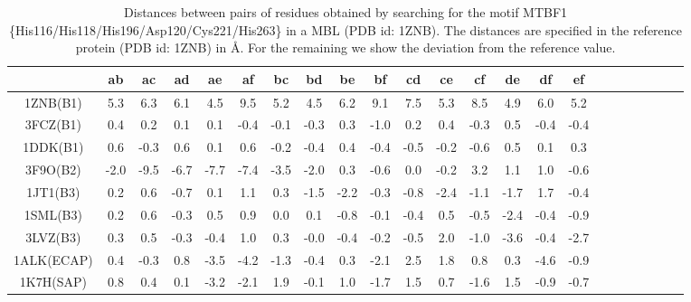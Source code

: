 \begin{center} 
\begin{table*} 
\caption { Distances between pairs of residues obtained by searching for the motif MTBF1 \{His116/His118/His196/Asp120/Cys221/His263\} in a MBL (PDB id: 1ZNB).  The distances are specified in the reference protein (PDB id: 1ZNB) in {\AA}. For the remaining we show the deviation from the reference value.
        }  
\begin{tabular}{ c  c c c c c c c c c c c c c c  c c  c c c c c c } 
 \hline
& ab & ac & ad & ae & af & bc & bd & be & bf & cd & ce & cf & de & df & ef  \\
\hline 
 1ZNB(B1)  & 5.3& 6.3& 6.1& 4.5& 9.5& 5.2& 4.5& 6.2& 9.1& 7.5& 5.3& 8.5& 4.9& 6.0& 5.2&  \\
 3FCZ(B1) &      0.4 &      0.2 &      0.1 &      0.1 &     -0.4 &     -0.1 &     -0.3 &      0.3 &     -1.0 &      0.2 &      0.4 &     -0.3 &      0.5 &     -0.4 &     -0.4 \\ 
 1DDK(B1) & 0.6& -0.3& 0.6& 0.1& 0.6& -0.2& -0.4& 0.4& -0.4& -0.5& -0.2& -0.6& 0.5& 0.1& 0.3\\
3F9O(B2) & -2.0& -9.5& -6.7& -7.7& -7.4& -3.5& -2.0& 0.3& -0.6& 0.0& -0.2& 3.2& 1.1& 1.0& -0.6& \\
 1JT1(B3) &      0.2 &      0.6 &     -0.7 &      0.1 &      1.1 &      0.3 &     -1.5 &     -2.2 &     -0.3 &     -0.8 &     -2.4 &     -1.1 &     -1.7 &      1.7 &     -0.4 \\ 
 1SML(B3) &      0.2 &      0.6 &     -0.3 &      0.5 &      0.9 &      0.0 &      0.1 &     -0.8 &     -0.1 &     -0.4 &      0.5 &     -0.5 &     -2.4 &     -0.4 &     -0.9 \\ 
3LVZ(B3) & 0.3& 0.5& -0.3& -0.4& 1.0& 0.3& -0.0& -0.4& -0.2& -0.5& 2.0& -1.0& -3.6& -0.4& -2.7&  \\
1ALK(ECAP) & 0.4& -0.3& 0.8& -3.5& -4.2& -1.3& -0.4& 0.3& -2.1& 2.5& 1.8& 0.8& 0.3& -4.6& -0.9&  \\
 1K7H(SAP) &      0.8 &      0.4 &      0.1 &     -3.2 &     -2.1 &      1.9 &     -0.1 &      1.0 &     -1.7 &      1.5 &      0.7 &     -1.6 &      1.5 &     -0.9 &     -0.7 \\ 
\hline 
\end{tabular}  \label{tabledis} 
\end{table*} 
\end{center} 
